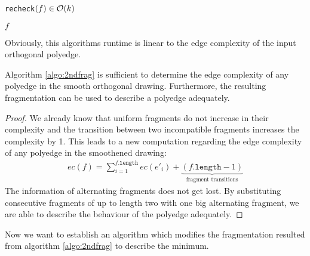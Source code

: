 \begin{algorithm}[H]
	\caption{\texttt{recheck}$(f) \in \mathcal{O}(k)$\label{algo:recheck}}
	\Return $f$
\end{algorithm}
Obviously, this algorithms runtime is linear to the edge complexity of the input orthogonal polyedge.
\begin{theorem}
	Algorithm \ref{algo:2ndfrag} is sufficient to determine the edge complexity of any polyedge in the smooth orthogonal drawing. Furthermore, the resulting fragmentation can be used to describe a polyedge adequately.
	\label{th:2ndfrag}
\end{theorem}
\begin{proof}
	We already know that uniform fragments do not increase in their complexity and the transition between two incompatible fragments increases the complexity by 1. This leads to a new computation regarding the edge complexity of any polyedge in the smoothened drawing:
	\begin{align}
	ec(f) = \sum_{i = 1}^{f.\texttt{length}} ec(e'_i) + \underbrace{(f.\texttt{length} - 1)}_{\text{fragment transitions}}\label{eq:2ndfrag}
	\end{align}
	The information of alternating fragments does not get lost. By substituting consecutive fragments of up to length two with one big alternating fragment, we are able to describe the behaviour of the polyedge adequately.
\end{proof}
Now we want to establish an algorithm which modifies the fragmentation resulted from algorithm \ref{algo:2ndfrag} to describe the minimum.\\
